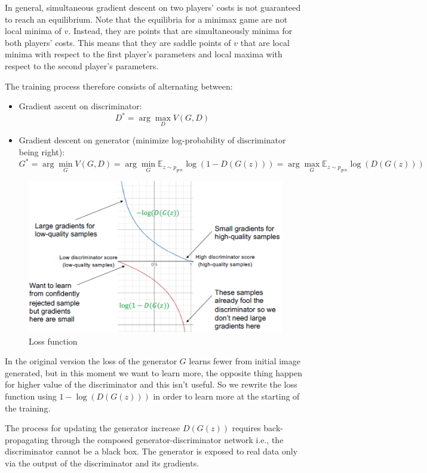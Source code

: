 In general, simultaneous gradient descent on two players’ costs is not guaranteed to reach an equilibrium. 
Note that the equilibria for a minimax game are not local minima of $v$. Instead, they are points that are 
simultaneously minima for both players’ costs. This means that they are saddle points of $v$ that are 
local minima with respect to the first player’s parameters and local maxima with respect to the second 
player's parameters.

The training process therefore consists of alternating between:
\begin{itemize}
    \item Gradient ascent on discriminator: 
        \begin{equation}
            D^\ast = \arg \max_D V(G,D)
        \end{equation}
    \item Gradient descent on generator (minimize log-probability of discriminator being right):
        \begin{equation}
            G^\ast = \arg \min_G V(G,D) = \arg \min_G \mathbb{E}_{z\sim p_{gen}} \log(1-D(G(z)))  =  \arg \max_G \mathbb{E}_{z\sim p_{gen}} \log(D(G(z)))
        \end{equation}
\end{itemize}

\begin{figure}[!ht]
    \centering
    \includegraphics[width=0.5\linewidth]{img/GAN/loss.png}
    \caption{Loss function}
    \label{fig:enter-label}
\end{figure}
 
In the original version the loss of the generator $G$ learns fewer from initial image generated, but in
this moment we want to learn more, the opposite thing happen for higher value of the discriminator and
this isn't useful. So we rewrite the loss function using  $1 - \log(D(G(z)))$ in order to learn more at
the starting of the training.

The process for updating the generator increase $D(G(z))$ requires back-propagating through the composed
generator-discriminator network i.e., the discriminator cannot be a black box. The generator is exposed to 
real data only via the output of the discriminator and its gradients.

